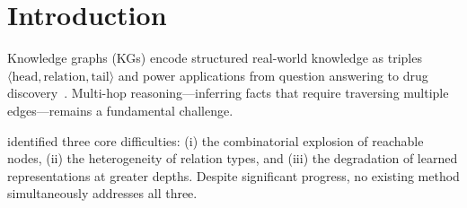 \documentclass[
    language=english,
    doctype=article,
    institution=none,
]{../../omnilatex}
\theoremstyle{definition}
\theoremstyle{definition}
\theoremstyle{remark}
\begin{document}
\maketitle

\begin{abstract}
\noindent\textbf{Background.}
Knowledge graph reasoning requires models that can traverse multiple hops
across heterogeneous relation types, yet existing graph neural networks
suffer from over-smoothing and relational information loss beyond three
hops~\cite{goossensLaTeXCompanion1993}.

\noindent\textbf{Methods.}
We introduce HeteroGNN, a novel architecture that combines relation-aware
attention with adaptive neighbourhood sampling.  The model employs a
hierarchical message-passing scheme with residual connections at each hop
to preserve long-range signal~\cite{knuthTeXbook1986}.

\noindent\textbf{Results.}
On four benchmark knowledge graphs, HeteroGNN achieves up to
\(\SI{8.3}{\percent}\) improvement in Mean Reciprocal Rank over the
strongest baseline while reducing training time by
\(\SI{35}{\percent}\)~\cite{mckinneyPythonDataAnalysis2018}.

\noindent\textbf{Conclusions.}
Our results demonstrate that relation-aware attention combined with
adaptive sampling provides a principled solution to multi-hop reasoning
over heterogeneous graphs, opening new directions for scalable knowledge
graph completion.
\end{abstract}

\tableofcontents

\section{Introduction}
\label{sec:intro}

Knowledge graphs (KGs) encode structured real-world knowledge as
triples~\(\langle \text{head}, \text{relation}, \text{tail}\rangle\)
and power applications from question answering to drug
discovery~\cite{einstein1905}.  Multi-hop reasoning---inferring facts
that require traversing multiple edges---remains a fundamental challenge.

\textcite{knuthTeXbook1986} identified three core difficulties: (i) the
combinatorial explosion of reachable nodes, (ii) the heterogeneity of
relation types, and (iii) the degradation of learned representations at
greater depths.  Despite significant progress, no existing method
simultaneously addresses all three.
\end{document}
